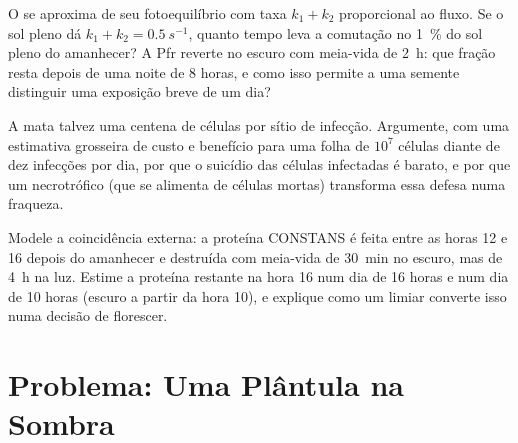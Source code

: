 \begin{exercise}[$\star\star\star$]\label{exo:b3:plant-molecular-physiology:10}
O  se aproxima de seu fotoequilíbrio com taxa $k_{1} + k_{2}$
proporcional ao fluxo. Se o sol pleno dá $k_{1} + k_{2} =
\qty{0.5}{s^{-1}}$, quanto tempo leva a comutação no \qty{1}{\%} do sol
pleno do amanhecer? A Pfr reverte no escuro com meia-vida de
\qty{2}{h}: que fração resta depois de uma noite de 8 horas, e como isso
permite a uma semente distinguir uma exposição breve de um dia?
\end{exercise}

\begin{exercise}[$\star\star\star$]\label{exo:b3:plant-molecular-physiology:11}
A  mata talvez uma centena de células por sítio de
infecção. Argumente, com uma estimativa grosseira de custo e benefício
para uma folha de $10^{7}$ células diante de dez infecções por dia, por
que o suicídio das células infectadas é barato, e por que um necrotrófico
(que se alimenta de células mortas) transforma essa defesa numa fraqueza.
\end{exercise}

\begin{exercise}[$\star\star\star$]\label{exo:b3:plant-molecular-physiology:12}
Modele a coincidência externa: a proteína CONSTANS é feita entre as horas
12 e 16 depois do amanhecer e destruída com meia-vida de \qty{30}{min} no
escuro, mas de \qty{4}{h} na luz. Estime a proteína restante na hora 16
num dia de 16 horas e num dia de 10 horas (escuro a partir da hora 10), e
explique como um limiar converte isso numa decisão de florescer.
\end{exercise}

\section{Problema: Uma Plântula na Sombra}

